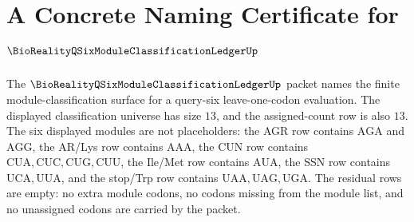 \chapter{A Concrete Naming Certificate for $\BioRealityQSixModuleClassificationLedgerUp$}
\label{ch:concrete-instances-bioreality-q-six-module-classification-ledger-namecert}

The $\BioRealityQSixModuleClassificationLedgerUp$ packet names the finite module-classification surface for a query-six leave-one-codon evaluation. The displayed classification universe has size $13$, and the assigned-count row is also $13$. The six displayed modules are not placeholders: the AGR row contains $\mathrm{AGA}$ and $\mathrm{AGG}$, the AR/Lys row contains $\mathrm{AAA}$, the CUN row contains $\mathrm{CUA},\mathrm{CUC},\mathrm{CUG},\mathrm{CUU}$, the Ile/Met row contains $\mathrm{AUA}$, the SSN row contains $\mathrm{UCA},\mathrm{UUA}$, and the stop/Trp row contains $\mathrm{UAA},\mathrm{UAG},\mathrm{UGA}$. The residual rows are empty: no extra module codons, no codons missing from the module list, and no unassigned codons are carried by the packet.

